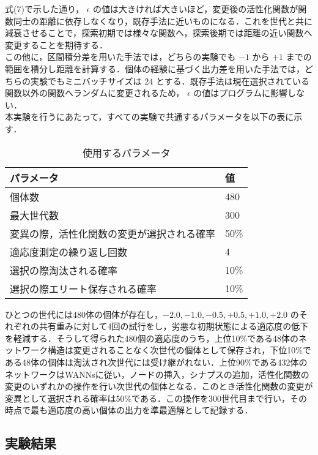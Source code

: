 式(7)で示した通り， $ \epsilon $ の値は大きければ大きいほど，変更後の活性化関数が関数同士の距離に依存しなくなり，既存手法に近いものになる．これを世代と共に減衰させることで，探索初期では様々な関数へ，探索後期では距離の近い関数へ変更することを期待する．\\

この他に，区間積分差を用いた手法では，どちらの実験でも $ -1 $ から $ +1 $ までの範囲を積分し距離を計算する．個体の経験に基づく出力差を用いた手法では，どちらの実験でもミニバッチサイズは $ 24 $ とする．既存手法は現在選択されている関数以外の関数へランダムに変更されるため， $ \epsilon $ の値はプログラムに影響しない．\\

本実験を行うにあたって，すべての実験で共通するパラメータを以下の表に示す．

\begin{table}[h]
    \caption{使用するパラメータ}
    \centering
    \begin{tabular}{ll}
        \hline
        パラメータ & 値 \\
        \hline \hline
        個体数 & 480 \\
        最大世代数 & 300 \\
        変異の際，活性化関数の変更が選択される確率 & 50\% \\
        適応度測定の繰り返し回数 & 4 \\
        選択の際淘汰される確率 & 10\% \\
        選択の際エリート保存される確率 & 10\% \\
        \hline
    \end{tabular}
\end{table}

ひとつの世代には480体の個体が存在し，$ -2.0, -1.0, -0.5, +0.5, +1.0, +2.0$ のそれぞれの共有重みに対して4回の試行をし，劣悪な初期状態による適応度の低下を軽減する．そうして得られた480個の適応度のうち，上位10\%である48体のネットワーク構造は変更されることなく次世代の個体として保存され，下位10\%である48体の個体は淘汰され次世代には受け継がれない．上位90\%である432体のネットワークはWANNsに従い，ノードの挿入，シナプスの追加，活性化関数の変更のいずれかの操作を行い次世代の個体となる．このとき活性化関数の変更が変異として選択される確率は50\%である．この操作を300世代目まで行い，その時点で最も適応度の高い個体の出力を準最適解として記録する．

\subsection{実験結果}
